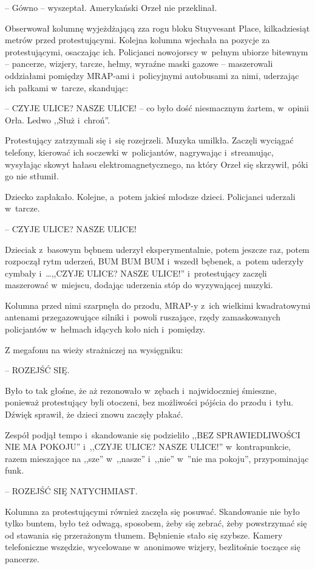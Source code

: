\documentclass[oneside,polish,11pt,sfheadings]{mwbk}
\begin{document}
-- Gówno -- wyszeptał. Amerykański Orzeł nie przeklinał.

Obserwował kolumnę wyjeżdżającą zza rogu bloku Stuyvesant Place,
kilkadziesiąt metrów przed protestującymi. Kolejna kolumna wjechała na
pozycje za protestującymi, osaczając ich. Policjanci nowojorscy w~pełnym
ubiorze bitewnym -- pancerze, wizjery, tarcze, hełmy, wyraźne maski
gazowe -- maszerowali oddziałami pomiędzy MRAP-ami i~policyjnymi
autobusami za nimi, uderzając ich pałkami w~tarcze, skandując: 

-- CZYJE ULICE? NASZE ULICE! -- co było dość niesmacznym żartem, w~opinii Orła.
Ledwo ,,Służ i~chroń''.

Protestujący zatrzymali się i~się rozejrzeli. Muzyka umilkła. Zaczęli
wyciągać telefony, kierować ich soczewki w~policjantów, nagrywając i~streamując, wysyłając skowyt hałasu elektromagnetycznego, na który Orzeł
się skrzywił, póki go nie stłumił.

Dziecko zapłakało. Kolejne, a~potem jakieś młodsze dzieci. Policjanci
uderzali w~tarcze. 

-- CZYJE ULICE? NASZE ULICE!

Dzieciak z~basowym bębnem uderzył eksperymentalnie, potem jeszcze raz,
potem rozpoczął rytm uderzeń, BUM BUM BUM i~wszedł bębenek, a~potem
uderzyły cymbały i~\ldots  ,,CZYJE ULICE? NASZE ULICE!'' i~protestujący
zaczęli maszerować w~miejscu, dodając uderzenia stóp do wyzywającej
muzyki.

Kolumna przed nimi szarpnęła do przodu, MRAP-y z~ich wielkimi
kwadratowymi antenami przegazowujące silniki i~powoli ruszające, rzędy
zamaskowanych policjantów w~hełmach idących koło nich i~pomiędzy.

Z megafonu na wieży strażniczej na wysięgniku: 

-- ROZEJŚĆ SIĘ. 

Było to
tak głośne, że aż rezonowało w~zębach i~najwidoczniej śmieszne, ponieważ
protestujący byli otoczeni, bez możliwości pójścia do przodu i~tyłu.
Dźwięk sprawił, że dzieci znowu zaczęły płakać.

Zespół podjął tempo i~skandowanie się podzieliło ,,BEZ SPRAWIEDLIWOŚCI
NIE MA POKOJU'' i~,,CZYJE ULICE? NASZE ULICE!'' w~kontrapunkcie, razem
mieszające na ,,sze'' w~,,nasze'' i~,,nie'' w~''nie ma pokoju'',
przypominając funk.

-- ROZEJŚĆ SIĘ NATYCHMIAST.

Kolumna za protestującymi również zaczęła się posuwać. Skandowanie nie
było tylko buntem, było też odwagą, sposobem, żeby się zebrać, żeby
powstrzymać się od stawania się przerażonym tłumem. Bębnienie stało się
szybsze. Kamery telefoniczne wszędzie, wycelowane w~anonimowe wizjery,
bezlitośnie toczące się pancerze.
\end{document}
